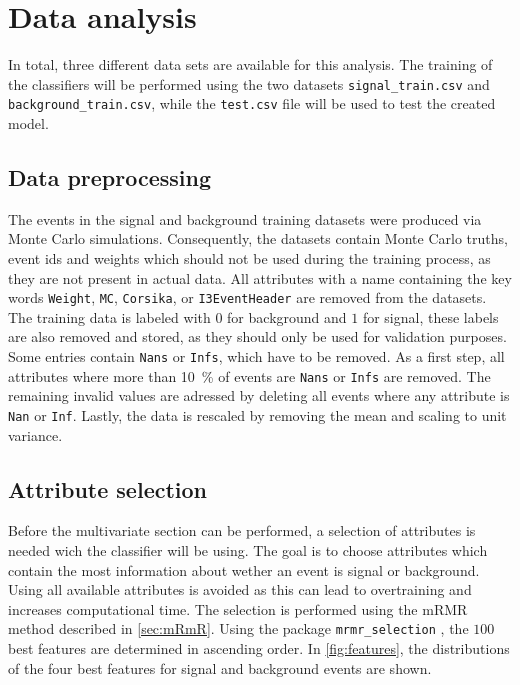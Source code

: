 \section{Data analysis}
\label{sec:Auswertung}

In total, three different data sets are available for this analysis. 
The training of the classifiers will be performed using the two datasets
\texttt{signal\_train.csv} and \texttt{background\_train.csv}, while the
\texttt{test.csv} file will be used to test the created model.

\subsection{Data preprocessing}

The events in the signal and background training datasets were produced via Monte Carlo simulations.
Consequently, the datasets contain Monte Carlo truths, event ids and weights which should not be
used during the training process, as they are not present in actual data.
All attributes with a name containing the key words \texttt{Weight}, \texttt{MC}, \texttt{Corsika}, or
\texttt{I3EventHeader} are removed from the datasets.
The training data is labeled with $0$ for background and $1$ for signal, these labels are also removed and 
stored, as they should only be used for validation purposes. Some entries contain \texttt{Nans} or
\texttt{Infs}, which have to be removed. As a first step, all attributes where more than \qty{10}{\percent}
of events are \texttt{Nans} or \texttt{Infs} are removed. The remaining invalid values are adressed by
deleting all events where any attribute is \texttt{Nan} or \texttt{Inf}.
Lastly, the data is rescaled by removing the mean and scaling to unit variance.

\subsection{Attribute selection}
\label{sec:att_selection}

Before the multivariate section can be performed, a selection of attributes is needed wich the classifier
will be using. The goal is to choose attributes which contain the most information about wether an event
is signal or background. Using all available attributes is avoided as this can lead to overtraining and
increases computational time.
The selection is performed using the mRMR method described in \autoref{sec:mRmR}. Using the package
\texttt{mrmr\_selection} \cite{mrmr}, the $100$ best features are determined in ascending order.
In \autoref{fig:features}, the distributions of the four best features for signal and background events
are shown.

